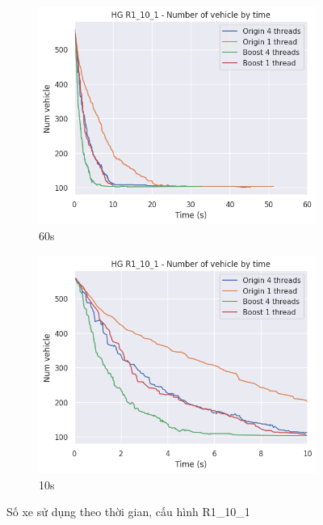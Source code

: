 \begin{figure}[H] %
  \label{fig:perf_ct_r1_10}
  \begin{subfigure}{.5\textwidth}
    \centering
    \includegraphics[width=1\linewidth]{figures/nv_time_60s_R1_10_1.png}
    \caption{60s}
    \label{fig:perf_ct_r1_10_60s}
  \end{subfigure}%
  \begin{subfigure}{.5\textwidth}
    \centering
    \includegraphics[width=1\linewidth]{figures/nv_time_10s_R1_10_1.png}
    \caption{10s}
    \label{fig:perf_ct_r1_10_10s}
  \end{subfigure}
  \caption{Số xe sử dụng theo thời gian, cấu hình R1\_10\_1}
\end{figure}


